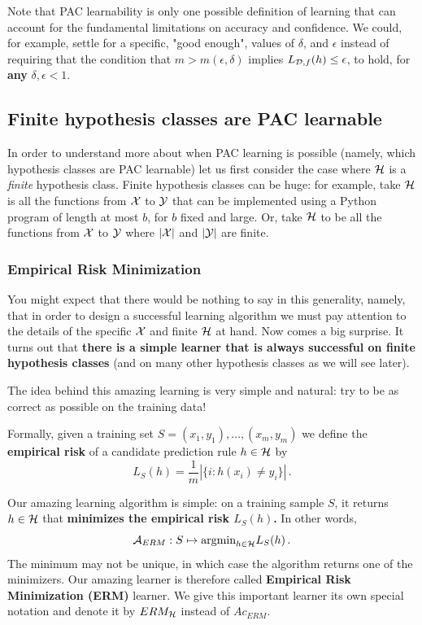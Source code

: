 Note that  PAC learnability is only one possible definition of learning that can account for the fundamental limitations on accuracy and confidence. We could, for example, settle for a specific, "good enough", values of $\delta$,  and $\epsilon$ instead of requiring that the condition that $m > m(\epsilon, \delta)$ implies  $L_{\mathcal{D}, f}(h) \le \epsilon$, to hold, for {\bf any} $\delta, \epsilon <1$.

\subsection{Finite hypothesis classes are PAC learnable}

In order to understand more about when PAC learning is possible (namely, which hypothesis classes are PAC learnable) let us first consider the case where $\mathcal{H}$ is a \textit{finite} hypothesis class.
Finite hypothesis classes can be huge: for example, take $\mathcal{H}$ is all the functions from $\mathcal{X}$ to $\mathcal{Y}$ that can be implemented using a Python program of length at most $b$, for $b$ fixed and large. Or, take $\mathcal{H}$ to be all the functions from $\mathcal{X}$ to $\mathcal{Y}$ where  $|\mathcal{X}|$ and $|\mathcal{Y}|$ are finite.

\subsubsection{Empirical Risk Minimization}

You might expect that there would be nothing to say in this generality, namely,
that in order to design a successful learning algorithm we must pay attention to
the details of the specific $\mathcal{X}$ and finite $\mathcal{H}$ at hand.
Now comes a big surprise. It turns out that {\bf there is a simple learner that is always successful on finite hypothesis classes} (and on many other hypothesis classes as we will see later).

The idea behind this amazing learning is very simple and natural: try to be as correct as possible on the training data!

Formally, given  a training set $S = (x_1,y_1),\ldots,(x_m,y_m)$ we define the {\bf empirical risk} of a candidate prediction rule $h\in\mathcal{H}$ by
$$L_S(h) = \frac{1}{m} |\{i : h(x_i)  \neq y_i\}|\,.$$

Our amazing learning algorithm is simple: on a training sample $S$, it returns $h \in \mathcal{H}$ that {\bf minimizes the empirical risk $L_S(h)$.} In other words,
\[
\mathcal{A}_{ERM} : S \mapsto \text{argmin}_{h\in\mathcal{H}} L_S(h)\,.
\]
The minimum may not be unique, in which case the algorithm returns one of the minimizers. Our amazing learner is therefore called \textbf{Empirical Risk Minimization (ERM)} learner. We give this important learner its own special notation and denote it by $ERM_{\mathcal{H}}$ instead of $Ac_{ERM}$.

